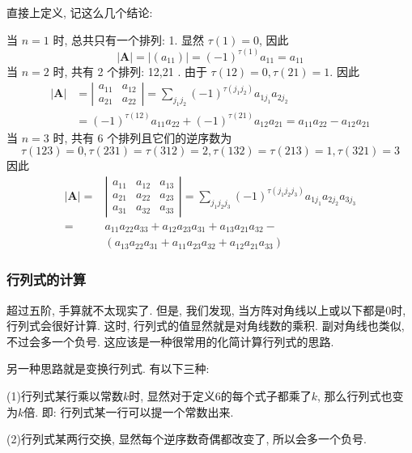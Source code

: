 \documentclass{article}
\begin{document}
	直接上定义, 记这么几个结论:

	当 $n=1$ 时, 总共只有一个排列: 1. 显然 $\tau(1)=0$, 因此
	$$
	|\boldsymbol{A}|=\left|\left(a_{11}\right)\right|=(-1)^{\tau(1)} a_{11}=a_{11}
	$$
	当 $n=2$ 时, 共有 2 个排列: 12,21 . 由于 $\tau(12)=0, \tau(21)=1$. 因此
	$$
	\begin{aligned}
		|\boldsymbol{A}| &=\left|\begin{array}{ll}
			a_{11} & a_{12} \\
			a_{21} & a_{22}
		\end{array}\right|=\sum_{j_{1} j_{2}}(-1)^{\tau\left(j_{1} j_{2}\right)} a_{1 j_{1}} a_{2 j_{2}} \\
		&=(-1)^{\tau(12)} a_{11} a_{22}+(-1)^{\tau(21)} a_{12} a_{21}=a_{11} a_{22}-a_{12} a_{21}
	\end{aligned}
	$$
	当 $n=3$ 时, 共有 6 个排列且它们的逆序数为
	$$
	\tau(123)=0, \tau(231)=\tau(312)=2, \tau(132)=\tau(213)=1, \tau(321)=3
	$$
	因此
	$$
	\begin{aligned}
		|\boldsymbol{A}|=&\left|\begin{array}{lll}
			a_{11} & a_{12} & a_{13} \\
			a_{21} & a_{22} & a_{23} \\
			a_{31} & a_{32} & a_{33}
		\end{array}\right|=\sum_{j_{1} j_{2} j_{3}}(-1)^{\tau\left(j_{1} j_{2} j_{3}\right)} a_{1 j_{1}} a_{2 j_{2}} a_{3 j_{3}} \\
		=& a_{11} a_{22} a_{33}+a_{12} a_{23} a_{31}+a_{13} a_{21} a_{32}-\\
		&\left(a_{13} a_{22} a_{31}+a_{11} a_{23} a_{32}+a_{12} a_{21} a_{33}\right)
	\end{aligned}
	$$
	\subsubsection{行列式的计算}
	超过五阶, 手算就不太现实了. 但是, 我们发现, 当方阵对角线以上或以下都是0时, 行列式会很好计算. 这时, 行列式的值显然就是对角线数的乘积. 副对角线也类似,不过会多一个负号. 这应该是一种很常用的化简计算行列式的思路.

	另一种思路就是变换行列式. 有以下三种:

	(1)行列式某行乘以常数$k$时, 显然对于定义6的每个式子都乘了$k$, 那么行列式也变为$k$倍. 即: 行列式某一行可以提一个常数出来.

	(2)行列式某两行交换, 显然每个逆序数奇偶都改变了, 所以会多一个负号.
\end{document}
